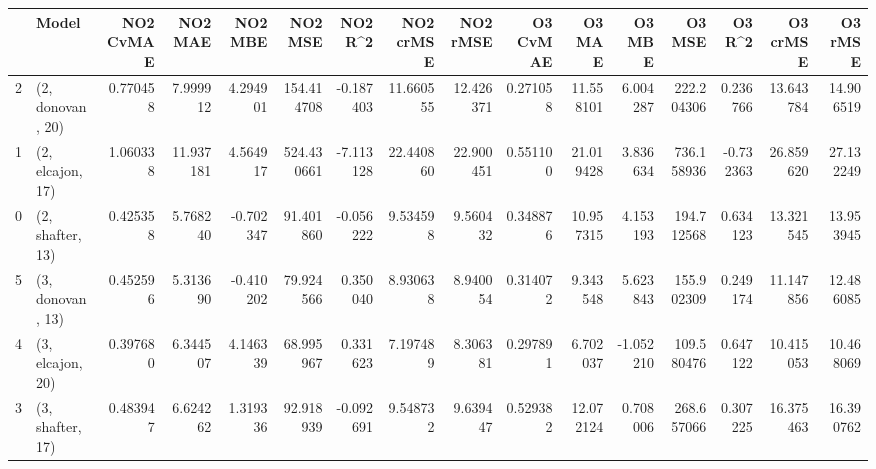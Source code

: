\begin{tabular}{llrrrrrrrrrrrrrr}
\toprule
{} &             Model &  NO2 CvMAE &    NO2 MAE &   NO2 MBE &     NO2 MSE &   NO2 R\textasciicircum2 &  NO2 crMSE &   NO2 rMSE &  O3 CvMAE &     O3 MAE &    O3 MBE &      O3 MSE &    O3 R\textasciicircum2 &   O3 crMSE &    O3 rMSE \\
\midrule
2 &  (2, donovan, 20) &   0.770458 &   7.999912 &  4.294901 &  154.414708 & -0.187403 &  11.660555 &  12.426371 &  0.271058 &  11.558101 &  6.004287 &  222.204306 &  0.236766 &  13.643784 &  14.906519 \\
1 &  (2, elcajon, 17) &   1.060338 &  11.937181 &  4.564917 &  524.430661 & -7.113128 &  22.440860 &  22.900451 &  0.551100 &  21.019428 &  3.836634 &  736.158936 & -0.732363 &  26.859620 &  27.132249 \\
0 &  (2, shafter, 13) &   0.425358 &   5.768240 & -0.702347 &   91.401860 & -0.056222 &   9.534598 &   9.560432 &  0.348876 &  10.957315 &  4.153193 &  194.712568 &  0.634123 &  13.321545 &  13.953945 \\
5 &  (3, donovan, 13) &   0.452596 &   5.313690 & -0.410202 &   79.924566 &  0.350040 &   8.930638 &   8.940054 &  0.314072 &   9.343548 &  5.623843 &  155.902309 &  0.249174 &  11.147856 &  12.486085 \\
4 &  (3, elcajon, 20) &   0.397680 &   6.344507 &  4.146339 &   68.995967 &  0.331623 &   7.197489 &   8.306381 &  0.297891 &   6.702037 & -1.052210 &  109.580476 &  0.647122 &  10.415053 &  10.468069 \\
3 &  (3, shafter, 17) &   0.483947 &   6.624262 &  1.319336 &   92.918939 & -0.092691 &   9.548732 &   9.639447 &  0.529382 &  12.072124 &  0.708006 &  268.657066 &  0.307225 &  16.375463 &  16.390762 \\
\bottomrule
\end{tabular}

